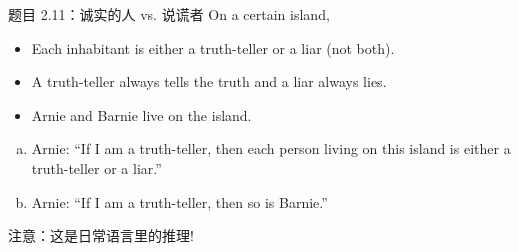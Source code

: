 \begin{frame}{}
  \begin{exampleblock}{题目 2.11：诚实的人 vs. 说谎者}
    On a certain island,
    \begin{itemize}
      \item Each inhabitant is either a truth-teller or a liar (not both).
      \item A truth-teller always tells the truth and a liar always lies.
      \item Arnie and Barnie live on the island.
    \end{itemize}

    \begin{enumerate}[(a)]
      \item Arnie: ``If I am a truth-teller, then each person living on this island is either a truth-teller or a liar.''
      \item Arnie: ``If I am a truth-teller, then so is Barnie.''
    \end{enumerate}
  \end{exampleblock}

  \vspace{0.50cm}
  \pause
  \centerline{注意：这是日常语言里的推理!}
\end{frame}
